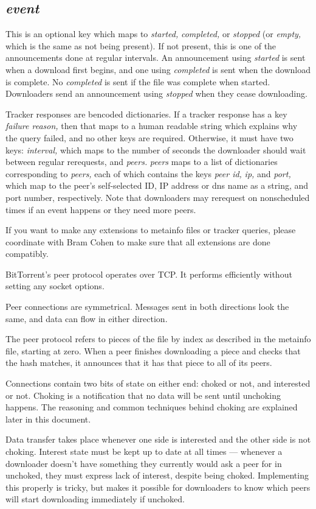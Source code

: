 \documentclass{article}
\begin{document}
{\subsection{\it event}}
This is an optional key which maps to {\it started,} {\it completed,} or {\it stopped} (or {\it empty,} which is the same as not being present). If not present, this is one of the announcements done at regular intervals. An announcement using {\it started} is sent when a download first begins, and one using {\it completed} is sent when the download is complete. No {\it completed} is sent if the file was complete when started. Downloaders send an announcement using {\it stopped} when they cease downloading.

Tracker responses are bencoded dictionaries. If a tracker response has a key {\it failure reason,} then that maps to a human readable string which explains why the query failed, and no other keys are required. Otherwise, it must have two keys: {\it interval,} which maps to the number of seconds the downloader should wait between regular rerequests, and {\it peers.} {\it peers} maps to a list of dictionaries corresponding to {\it peers,} each of which contains the keys {\it peer id,} {\it ip,} and {\it port,} which map to the peer's self-selected ID, IP address or dns name as a string, and port number, respectively. Note that downloaders may rerequest on nonscheduled times if an event happens or they need more peers.

If you want to make any extensions to metainfo files or tracker queries, please coordinate with Bram Cohen to make sure that all extensions are done compatibly.

BitTorrent's peer protocol operates over TCP. It performs efficiently without setting any socket options.

Peer connections are symmetrical. Messages sent in both directions look the same, and data can flow in either direction.

The peer protocol refers to pieces of the file by index as described in the metainfo file, starting at zero. When a peer finishes downloading a piece and checks that the hash matches, it announces that it has that piece to all of its peers.

Connections contain two bits of state on either end: choked or not, and interested or not. Choking is a notification that no data will be sent until unchoking happens. The reasoning and common techniques behind choking are explained later in this document.

Data transfer takes place whenever one side is interested and the other side is not choking. Interest state must be kept up to date at all times --- whenever a downloader doesn't have something they currently would ask a peer for in unchoked, they must express lack of interest, despite being choked. Implementing this properly is tricky, but makes it possible for downloaders to know which peers will start downloading immediately if unchoked.
\end{document}
